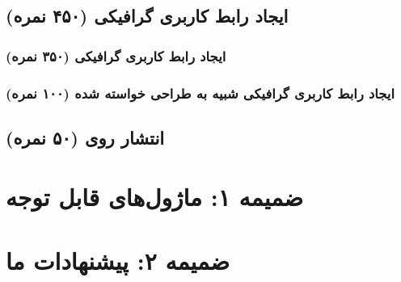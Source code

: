 \documentclass[a4paper]{report}
\begin{document}
\section{ایجاد رابط کاربری گرافیکی (۴۵۰ نمره)}
\subsection{ایجاد رابط کاربری گرافیکی (۳۵۰ نمره)}


\subsection{ایجاد رابط کاربری گرافیکی شبیه به طراحی خواسته شده (۱۰۰ نمره)}


\section{انتشار روی  (۵۰ نمره)}


\chapter{ضمیمه ۱: ماژول‌های قابل توجه}


\chapter{ضمیمه ۲: پیشنهادات ما}

\end{document}
